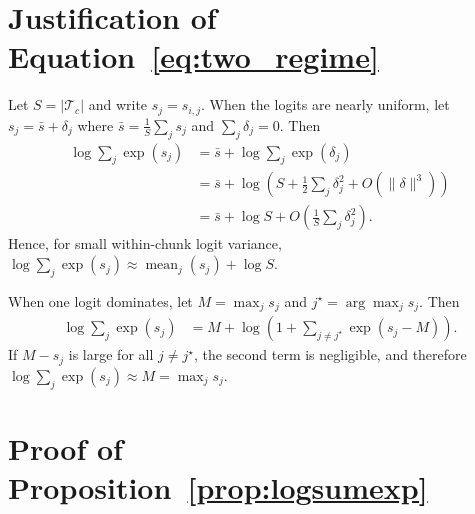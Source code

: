 \section{Justification of Equation~\ref{eq:two_regime}}\label{apdx:logsumexp_two_regime}
Let $S=|\mathcal{T}_c|$ and write $s_j=s_{i,j}$.
When the logits are nearly uniform, let
$
s_j=\bar{s}+\delta_j
$
where
$
\bar{s}=\frac{1}{S}\sum_j s_j
$
and
$
\sum_j\delta_j=0
$.
Then
\begin{align}
\log\sum_j \exp(s_j)
&= \bar{s}+\log\sum_j\exp(\delta_j) \\
&= \bar{s}+\log\left(S+\frac{1}{2}\sum_j\delta_j^2+O(\|\delta\|^3)\right) \\
&= \bar{s}+\log S+O\left(\frac{1}{S}\sum_j\delta_j^2\right).
\end{align}
Hence, for small within-chunk logit variance,
$
\log\sum_j\exp(s_j)\approx \operatorname{mean}_j(s_j)+\log S
$.

When one logit dominates, let
$
M=\max_j s_j
$
and
$
j^\star=\arg\max_j s_j
$.
Then
\begin{align}
\log\sum_j\exp(s_j)
&= M+\log\left(1+\sum_{j\neq j^\star}\exp(s_j-M)\right).
\end{align}
If $M-s_j$ is large for all $j\neq j^\star$, the second term is negligible, and therefore
$
\log\sum_j\exp(s_j)\approx M=\max_j s_j
$.
\section{Proof of Proposition~\ref{prop:logsumexp}}\label{appdx:proof_of_logsumexp}


